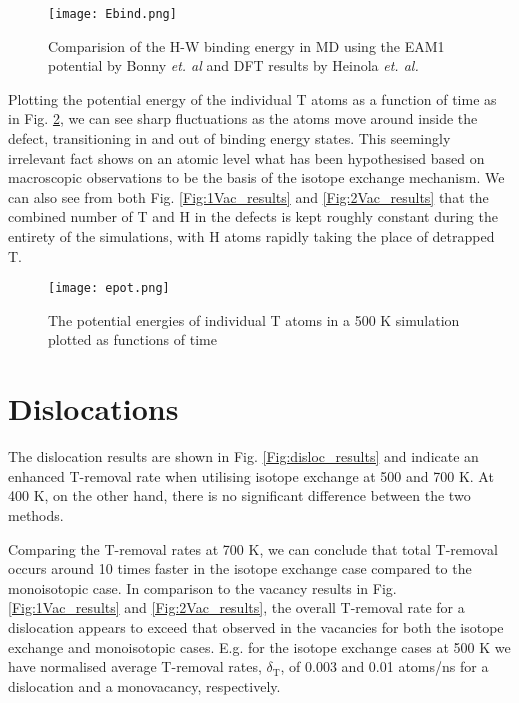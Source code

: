 \begin{figure}[!ht]
	\center
	\texttt{[image: Ebind.png]}
	\caption{Comparision of the H-W binding energy in MD using the EAM1 potential by Bonny \textit{et. al} and DFT results by Heinola \textit{et. al. }\cite{heinolaTungstenDFT}}
	\label{Fig:Ebind1H_DFT}
\end{figure}

Plotting the potential energy of the individual T atoms as a function of time as in Fig. \ref{Fig:Epot}, we can see sharp fluctuations as the atoms move around inside the defect, transitioning in and out of binding energy states.
This seemingly irrelevant fact shows on an atomic level what has been hypothesised based on macroscopic observations to be the basis of the isotope exchange mechanism.
We can also see from both Fig. \ref{Fig:1Vac_results} and \ref{Fig:2Vac_results} that the combined number of T and H in the defects is kept roughly constant during the entirety of the simulations, with H atoms rapidly taking the place of detrapped T.

\begin{figure}[!ht]
	\center
	\texttt{[image: epot.png]}
	\caption{The potential energies of individual T atoms in a 500 K simulation plotted as functions of time\vspace*{6mm}}
	\label{Fig:Epot}
\end{figure}


\section{Dislocations}
The dislocation results are shown in Fig. \ref{Fig:disloc_results} and indicate an enhanced T-removal rate when utilising isotope exchange at 500 and 700 K. 
At 400 K, on the other hand, there is no significant difference between the two methods.

Comparing the T-removal rates at 700 K, we can conclude that total T-removal occurs around 10 times faster in the isotope exchange case compared to the monoisotopic case.
In comparison to the vacancy results in Fig. \ref{Fig:1Vac_results} and \ref{Fig:2Vac_results}, the overall T-removal rate for a dislocation appears to exceed that observed in the vacancies for both the isotope exchange and monoisotopic cases.
E.g. for the isotope exchange cases at 500 K we have normalised average T-removal rates, $\delta_{\text{T}}$, of 0.003 and 0.01 atoms/ns for a dislocation and a monovacancy, respectively.

